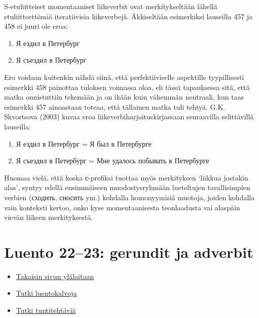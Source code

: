 \documentclass[]{scrartcl}
\providecommand{\tightlist}{%
  \setlength{\itemsep}{0pt}\setlength{\parskip}{0pt}}
\begin{document}
S-etuliitteiset momentaaniset liikeverbit ovat merkitykseltään lähellä
etuliitteettömiä iteratiivisia liikeverbejä. Äkkiseltään esimerkiksi
lauseilla 457 ja 458 ei juuri ole eroa:

\begin{enumerate}
\def\labelenumi{(\arabic{enumi})}
\setcounter{enumi}{456}
\tightlist
\item
  Я ездил в Петербург
\item
  Я съездил в Петербург
\end{enumerate}

Ero voidaan kuitenkin nähdä siinä, että perfektiiviselle aspektille
tyypillisesti esimerkki 458 painottaa tuloksen voimassa oloa, eli tässä
tapauksessa sitä, että matka onnistuttiin tekemään ja on ikään kuin
vähemmän neutraali, kun taas esimerkki 457 ainoastaan toteaa, että
tällainen matka tuli tehtyä. G.K. Skvortsova (2003) kuvaa eroa
liikeverbiharjoituskirjassaan seuraavilla selittävillä lauseilla:

\begin{enumerate}
\def\labelenumi{(\arabic{enumi})}
\setcounter{enumi}{458}
\tightlist
\item
  Я ездил в Петербург = Я был в Петербурге
\item
  Я съездил в Петербург = Мне удалось побывать в Петербурге
\end{enumerate}

Huomaa vielä, että koska с-prefiksi tuottaa myös merkityksen `liikkua
jostakin alas', syntyy edellä ensimmäiseen muodostysryhmään lueteltujen
tavallisimpien verbien (сходить, сносить ym.) kohdalla homonyymisiä
muotoja, joiden kohdalla vain konteksti kertoo, onko kyse
momentaanisesta teonlaadusta vai alaspäin vievän liikeen merkityksestä.

\section{Luento 22--23: gerundit ja
adverbit}\label{luento-2223-gerundit-ja-adverbit}

\begin{itemize}
\tightlist
\item
  \href{https://mustikka.uta.fi/~juho_harme/morfologia/\#tästä-kurssista}{Takaisin
  sivun ylälaitaan}
\item
  \href{http://mustikka.uta.fi/~juho_harme/morfologia/presentations/luento22.html}{Tutki
  luentokalvoja}
\item
  \href{http://mustikka.uta.fi/~juho_harme/morfologia/tehtavat/luento22.pdf}{Tutki
  tuntitehtäviä}
\end{itemize}
\end{document}
